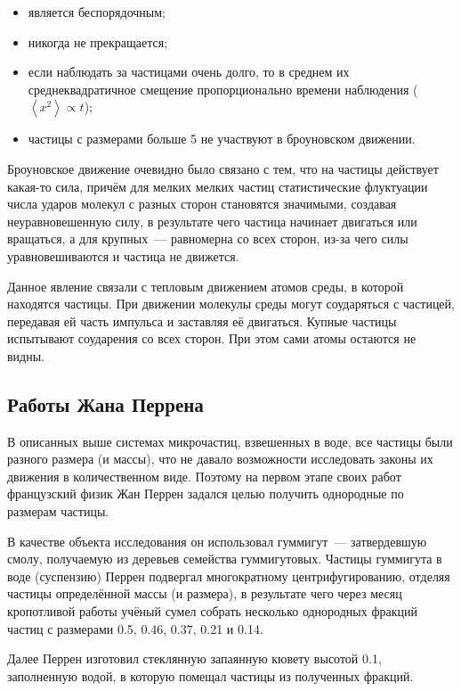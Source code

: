 \begin{itemize}
    \item является беспорядочным;
    \item никогда не прекращается;
    \item если наблюдать за частицами очень долго, то в среднем их среднеквадратичное смещение пропорционально времени наблюдения ($\left\langle x^2\right\rangle \varpropto t $);
    \item частицы с размерами больше \qty{5}{\ruUm} не участвуют в броуновском движении.
\end{itemize}

Броуновское движение очевидно было связано с тем, что на частицы действует какая-то сила, причём для мелких мелких частиц статистические флуктуации числа ударов молекул с разных сторон становятся значимыми, создавая неуравновешенную силу, в результате чего частица начинает двигаться или вращаться, а для крупных~--- равномерна со всех сторон, из-за чего силы уравновешиваются и частица не движется.

Данное явление связали с тепловым движением атомов среды, в которой находятся частицы. При движении молекулы среды могут соударяться с частицей, передавая ей часть импульса и заставляя её двигаться. Купные частицы испытывают соударения со всех сторон. При этом сами атомы остаются не видны.

\subsection*{Работы Жана Перрена}

В описанных выше системах микрочастиц, взвешенных в воде, все частицы были разного размера (и массы), что не давало возможности исследовать законы их движения в количественном виде. Поэтому на первом этапе своих работ французский физик Жан Перрен задался целью получить однородные по размерам частицы.

В качестве объекта исследования он использовал гуммигут~--- затвердевшую смолу, получаемую из деревьев семейства гуммигутовых. Частицы гуммигута в воде (суспензию) Перрен подвергал многократному центрифугированию, отделяя частицы определённой массы (и размера), в результате чего через месяц кропотливой работы учёный сумел собрать несколько однородных фракций частиц с размерами \num{0,5}, \num{0,46}, \num{0,37}, \num{0,21} и \qty{0,14}{\ruUm}.

Далее Перрен изготовил стеклянную запаянную кювету высотой \qty{0,1}{\ruMm}, заполненную водой, в которую помещал частицы из полученных фракций.

